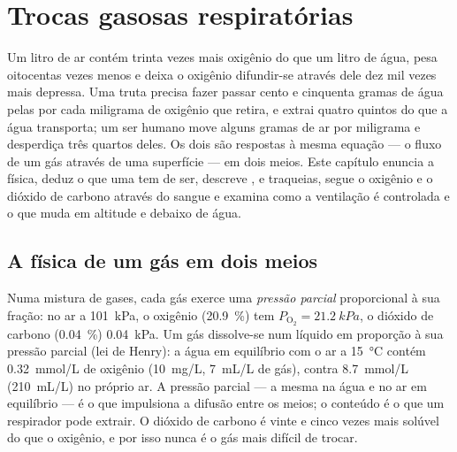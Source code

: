 \chapter{Trocas gasosas respiratórias}\label{ch:b1:gas-exchange}

Um litro de ar contém trinta vezes mais oxigênio do que um litro de
água, pesa oitocentas vezes menos e deixa o oxigênio difundir-se
através dele dez mil vezes mais depressa. Uma truta precisa fazer
passar cento e cinquenta gramas de água pelas  por cada
miligrama de oxigênio que retira, e extrai quatro quintos do que a
água transporta; um ser humano move alguns gramas de ar por miligrama
e desperdiça três quartos deles. Os dois  são respostas à mesma
equação --- o fluxo de um gás através de uma superfície --- em dois
meios. Este capítulo enuncia a física, deduz o que uma  tem de ser, descreve ,  e traqueias, segue o
oxigênio e o dióxido de carbono através do sangue e examina como a
ventilação é controlada e o que muda em altitude e debaixo de água.

\section{A física de um gás em dois meios}

\begin{definition}\label{def:b1:gas-exchange:partial}
Numa mistura de gases, cada gás exerce uma \emph{pressão parcial}
proporcional à sua fração: no ar a \qty{101}{kPa}, o oxigênio
(\qty{20.9}{\%}) tem $P_{\mathrm{O_2}} = \qty{21.2}{kPa}$, o dióxido
de carbono (\qty{0.04}{\%}) \qty{0.04}{kPa}. Um gás dissolve-se num
líquido em proporção à sua pressão parcial (lei de Henry): a água em
equilíbrio com o ar a \qty{15}{\celsius} contém \qty{0.32}{mmol/L} de
oxigênio (\qty{10}{mg/L}, \qty{7}{mL/L} de gás), contra
\qty{8.7}{mmol/L} (\qty{210}{mL/L}) no próprio ar. A pressão parcial
--- a mesma na água e no ar em equilíbrio --- é o que impulsiona a
difusão entre os meios; o conteúdo é o que um respirador pode extrair.
O dióxido de carbono é vinte e cinco vezes mais solúvel do que o
oxigênio, e por isso nunca é o gás mais difícil de trocar.
\end{definition}


